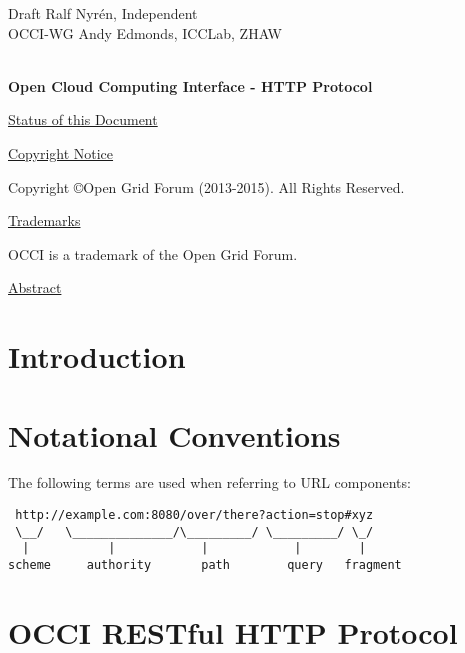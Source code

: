 \documentclass[10pt,a4paper]{article}
\begin{document}
\thispagestyle{empty}

Draft \hfill Ralf Nyrén, Independent \\
OCCI-WG \hfill Andy Edmonds, ICCLab, ZHAW \\
\\

\vspace*{0.5in}

\begin{Large}
\textbf{Open Cloud Computing Interface - HTTP Protocol}
\end{Large}

\vspace*{0.5in}

\underline{Status of this Document}



\underline{Copyright Notice}

Copyright \copyright Open Grid Forum (2013-2015). All Rights Reserved.

\underline{Trademarks}

OCCI is a trademark of the Open Grid Forum.

\underline{Abstract}



\newpage
\tableofcontents
\newpage

\section{Introduction}
\label{sec:intro}


\section{Notational Conventions}
\label{sec:not_conv}


The following terms \cite{rfc3986} are used when referring to URL
components:

\begin{verbatim}
 http://example.com:8080/over/there?action=stop#xyz
 \__/   \______________/\_________/ \_________/ \_/
  |           |            |            |        |
scheme     authority       path        query   fragment
\end{verbatim}

\section{OCCI RESTful HTTP Protocol}
\end{document}
